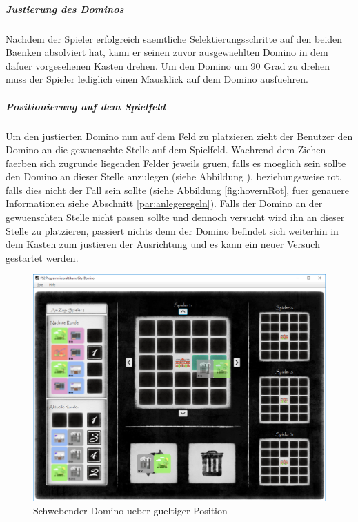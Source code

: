 \subparagraph{Justierung des Dominos}
Nachdem der Spieler erfolgreich saemtliche Selektierungsschritte auf den beiden Baenken absolviert hat, kann er seinen zuvor ausgewaehlten Domino in dem dafuer vorgesehenen Kasten drehen. Um den Domino um 90 Grad zu drehen muss der Spieler lediglich einen Mausklick auf dem Domino ausfuehren. 

\subparagraph{Positionierung auf dem Spielfeld}
Um den justierten Domino nun auf dem Feld zu platzieren zieht der Benutzer den Domino an die gewuenschte Stelle auf dem Spielfeld. Waehrend dem Ziehen faerben sich zugrunde liegenden Felder jeweils gruen, falls es moeglich sein sollte den Domino an dieser Stelle anzulegen (siehe Abbildung \pageref{fig:hovernGruen}), beziehungsweise rot, falls dies nicht der Fall sein sollte (siehe Abbildung \ref{fig:hovernRot}, fuer genauere Informationen siehe Abschnitt \ref{par:anlegeregeln}). Falls der Domino an der gewuenschten Stelle nicht passen sollte und dennoch versucht wird ihn an dieser Stelle zu platzieren, passiert nichts denn der Domino befindet sich weiterhin in dem Kasten zum justieren der Ausrichtung und es kann ein neuer Versuch gestartet werden. 

\begin{figure}
	\centering
	\includegraphics{screenshots/screenshot_HovernGruen}
	\caption{Schwebender Domino ueber gueltiger Position}
	\label{fig:hovernGruen}
\end{figure}

